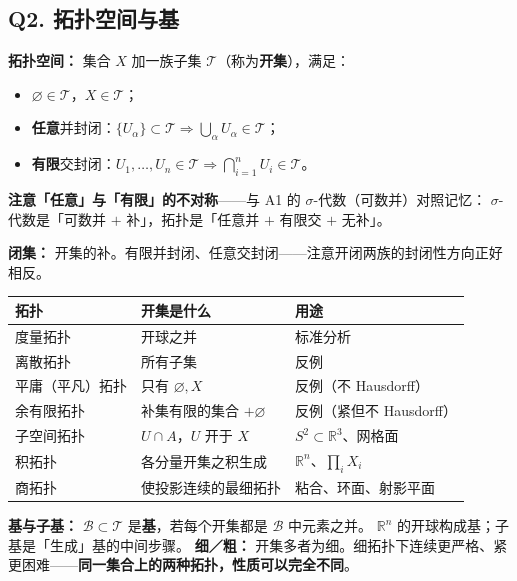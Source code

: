 \subsection{Q2. 拓扑空间与基}

\textbf{拓扑空间：} 集合 $X$ 加一族子集 $\mathcal T$（称为\textbf{开集}），满足：
\begin{itemize}
  \item $\varnothing\in\mathcal T$，$X\in\mathcal T$；
  \item \textbf{任意}并封闭：$\{U_\alpha\}\subset\mathcal T\Rightarrow\bigcup_\alpha U_\alpha\in\mathcal T$；
  \item \textbf{有限}交封闭：$U_1,\dots,U_n\in\mathcal T\Rightarrow\bigcap_{i=1}^nU_i\in\mathcal T$。
\end{itemize}

\textbf{注意「任意」与「有限」的不对称}——与 A1 的 $\sigma$-代数（可数并）对照记忆：
$\sigma$-代数是「可数并 $+$ 补」，拓扑是「任意并 $+$ 有限交 $+$ 无补」。

\textbf{闭集：} 开集的补。有限并封闭、任意交封闭——注意开闭两族的封闭性方向正好相反。

\begin{center}
\begin{tabular}{lll}
\toprule
\textbf{拓扑} & \textbf{开集是什么} & \textbf{用途} \\
\midrule
度量拓扑 & 开球之并 & 标准分析 \\
离散拓扑 & 所有子集 & 反例 \\
平庸（平凡）拓扑 & 只有 $\varnothing,X$ & 反例（不 Hausdorff） \\
余有限拓扑 & 补集有限的集合 $+\varnothing$ & 反例（紧但不 Hausdorff） \\
子空间拓扑 & $U\cap A$，$U$ 开于 $X$ & $S^2\subset\mathbb R^3$、网格面 \\
积拓扑 & 各分量开集之积生成 & $\mathbb R^n$、$\prod_i X_i$ \\
商拓扑 & 使投影连续的最细拓扑 & 粘合、环面、射影平面 \\
\bottomrule
\end{tabular}
\end{center}

\textbf{基与子基：} $\mathcal B\subset\mathcal T$ 是\textbf{基}，若每个开集都是 $\mathcal B$ 中元素之并。
$\mathbb R^n$ 的开球构成基；子基是「生成」基的中间步骤。
\textbf{细／粗：} 开集多者为细。细拓扑下连续更严格、紧更困难——\textbf{同一集合上的两种拓扑，性质可以完全不同}。

